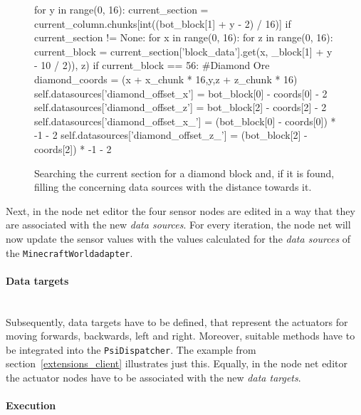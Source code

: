 		\begin{figure}[ht]
			\centering
			\begin{minipage}{17cm}
				\begin{pseudocode}
for y in range(0, 16):
 current_section = current_column.chunks[int((bot_block[1] + y -  2) / 16)]
 if current_section != None:
  for x in range(0, 16):
   for z in range(0, 16):
    current_block = current_section['block_data'].get(x, _block[1] + y - 10 / 2)), z)
    if current_block == 56: #Diamond Ore
     diamond_coords = (x + x_chunk * 16,y,z + z_chunk * 16)
     self.datasources['diamond_offset_x'] = bot_block[0] - coords[0] - 2
     self.datasources['diamond_offset_z'] = bot_block[2] - coords[2] - 2
     self.datasources['diamond_offset_x_'] = (bot_block[0] - coords[0]) * -1 - 2
     self.datasources['diamond_offset_z_'] = (bot_block[2] - coords[2]) * -1 - 2
			\end{pseudocode}
		\caption[Searching the for a diamond block]{Searching the current section for a diamond block and, if it is found, filling the concerning data sources with the distance towards it.}
		\label{listing_sensors}
	\end{minipage}
\end{figure}

Next, in the node net editor the four sensor nodes are edited in a way that they are associated with the new \emph{data sources}. For every iteration, the node net will now update the sensor values with the values calculated for the \emph{data sources} of the \texttt{MinecraftWorldadapter}.

\paragraph{Data targets}$\;$ \\

Subsequently, data targets have to be defined, that represent the actuators for moving forwards, backwards, left and right. Moreover, suitable methods have to be integrated into the \texttt{PsiDispatcher}. The example from section~\ref{extensions_client} illustrates just this. Equally, in the node net editor the actuator nodes have to be associated with the new \emph{data targets}.

\paragraph{Execution}$\;$ \\

